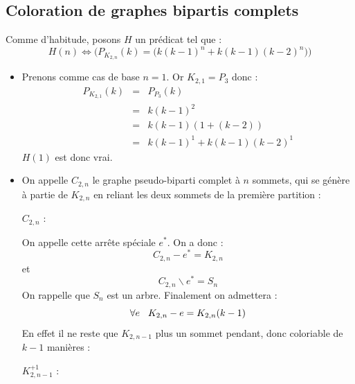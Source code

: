 \subsection{Coloration de graphes bipartis complets}
Comme d'habitude, posons $H$ un prédicat tel que : 
\[ H(n) \Leftrightarrow \Big(P_{K_{2,n}}(k) = \big(k(k-1)^n + k(k-1)(k-2)^n\big)\Big) \]
\begin{itemize}
\item Prenons comme cas de base $n = 1$. Or $K_{2,1} = P_3$ donc :
\begin{eqnarray*}
P_{K_{2,1}}(k)			& = & P_{P_3}(k)				\\
						& = & k(k-1)^2					\\
						& = & k(k-1)(1 + (k-2))			\\
						& = & k(k-1)^1 + k(k-1)(k-2)^1	
\end{eqnarray*}
$H(1)$ est donc vrai.
\item On appelle $C_{2,n}$ le graphe pseudo-biparti complet à $n$ sommets, qui se génère à partie de $K_{2,n}$ en reliant les deux sommets de la première partition :

\begin{center}
$C_{2,n}$ : 
\end{center}

On appelle cette arrête spéciale $e^*$. On a donc :
\[ C_{2,n}-e^* = K_{2,n} \]
et
\[ C_{2,n} \backslash{e^*} = S_n \]
On rappelle que $S_n$ est un arbre. Finalement on admettera :
\[ \forall{e} \hspace{3mm} K_{2,n}-e = K_{2,n}(k-1) \]
En effet il ne reste que $K_{2,n-1}$ plus un sommet pendant, donc coloriable de $k-1$ manières :

\begin{center}
$K_{2,n-1}^{+1}$ : 
\end{center}


\end{itemize}
